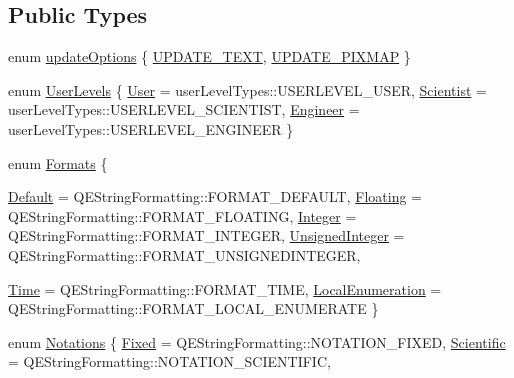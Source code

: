\subsection*{Public Types}
\begin{DoxyCompactItemize}
\item 
enum \hyperlink{classQELabel_ab16e8eccc9c9f29ca83472a52913b7f2}{updateOptions} \{ \hyperlink{classQELabel_ab16e8eccc9c9f29ca83472a52913b7f2a0b0bf0aa9ccf876976639be6e9eea7e2}{UPDATE\_\-TEXT}, 
\hyperlink{classQELabel_ab16e8eccc9c9f29ca83472a52913b7f2a270826ec92fb4b1f106a8305f7d39b62}{UPDATE\_\-PIXMAP}
 \}
\item 
enum \hyperlink{classQELabel_ada938d547e11d1ca32786d8bb913ca8a}{UserLevels} \{ \hyperlink{classQELabel_ada938d547e11d1ca32786d8bb913ca8aac5f9027113d6e38a1dbc7e753f96ae8a}{User} =  userLevelTypes::USERLEVEL\_\-USER, 
\hyperlink{classQELabel_ada938d547e11d1ca32786d8bb913ca8aaee758ecac87a743fc83bbb6cedd7f94e}{Scientist} =  userLevelTypes::USERLEVEL\_\-SCIENTIST, 
\hyperlink{classQELabel_ada938d547e11d1ca32786d8bb913ca8aa563d52586b8f110854e9e60353c60d8f}{Engineer} =  userLevelTypes::USERLEVEL\_\-ENGINEER
 \}
\item 
enum \hyperlink{classQELabel_aabe3af69c52e02d9b1341f894644dc6b}{Formats} \{ \par
\hyperlink{classQELabel_aabe3af69c52e02d9b1341f894644dc6ba20c007f12c1a18762a899a8f2d662cac}{Default} =  QEStringFormatting::FORMAT\_\-DEFAULT, 
\hyperlink{classQELabel_aabe3af69c52e02d9b1341f894644dc6bacb3167f8ab682d6e0cb6cf9719d81a54}{Floating} =  QEStringFormatting::FORMAT\_\-FLOATING, 
\hyperlink{classQELabel_aabe3af69c52e02d9b1341f894644dc6bab223c4dc5a563f7e083df3cfd7d6fe8b}{Integer} =  QEStringFormatting::FORMAT\_\-INTEGER, 
\hyperlink{classQELabel_aabe3af69c52e02d9b1341f894644dc6ba41973cafb0dfe0658c8d48c1a5c24135}{UnsignedInteger} =  QEStringFormatting::FORMAT\_\-UNSIGNEDINTEGER, 
\par
\hyperlink{classQELabel_aabe3af69c52e02d9b1341f894644dc6bacadc0632acccca1e42279bdea1525dff}{Time} =  QEStringFormatting::FORMAT\_\-TIME, 
\hyperlink{classQELabel_aabe3af69c52e02d9b1341f894644dc6ba347da402e8e7add2aae74206e651e749}{LocalEnumeration} =  QEStringFormatting::FORMAT\_\-LOCAL\_\-ENUMERATE
 \}
\item 
enum \hyperlink{classQELabel_ab0a211fb5b8bd3f95b8c40b4aaaf839c}{Notations} \{ \hyperlink{classQELabel_ab0a211fb5b8bd3f95b8c40b4aaaf839ca0d12bc5390fa57e774f1c6b129c205f4}{Fixed} =  QEStringFormatting::NOTATION\_\-FIXED, 
\hyperlink{classQELabel_ab0a211fb5b8bd3f95b8c40b4aaaf839ca58e08cc51de540f4e099253c8b279421}{Scientific} =  QEStringFormatting::NOTATION\_\-SCIENTIFIC, 

\end{DoxyCompactItemize}
